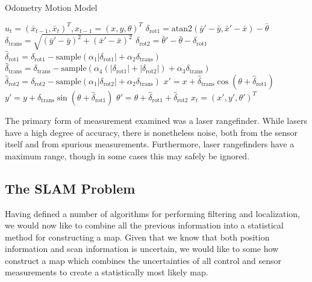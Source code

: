 \documentclass[english]{article}
\begin{document}
\begin{algorithm}
\caption{Odometry Motion Model}
\label{alg:odometry_model}
\begin{algorithmic}
	\REQUIRE $u_t = (\bar{x}_{t-1},\bar{x}_t)^T, x_{t-1} = (x, y, \theta)^T$
        \STATE $\delta_{\mathrm{rot1}} = \mathrm{atan2}(\bar{y}' - \bar{y}, \bar{x}' - \bar{x}) - \bar{\theta}$
        \STATE $\delta_{\mathrm{trans}} = \sqrt{(\bar{y}' - \bar{y})^2 + (\bar{x}' - \bar{x})^2}$
        \STATE $\delta_{\mathrm{rot2}} = \bar{\theta}' - \bar{\theta} - \delta_{\mathrm{rot1}}$
        \STATE $\hat{\delta}_{\mathrm{rot1}} = \delta_{\mathrm{rot1}} - \textrm{sample}(\alpha_1|\delta_{\mathrm{rot1}}| + \alpha_2\delta_{\mathrm{trans}})$
        \STATE $\hat{\delta}_{\mathrm{trans}} = \delta_{\mathrm{trans}} - \textrm{sample}(\alpha_4(|\delta_{\mathrm{rot1}}| + |\delta_{\mathrm{rot2}}|)+ \alpha_3\delta_{\mathrm{trans}})$
        \STATE $\hat{\delta}_{\mathrm{rot2}} = \delta_{\mathrm{rot2}} - \textrm{sample}(\alpha_1|\delta_{\mathrm{rot2}}| + \alpha_2\delta_{\mathrm{trans}})$
        \STATE $x' = x + \hat{\delta}_{\mathrm{trans}}\cos{(\theta + \hat{\delta}_{\mathrm{rot1}})} $
        \STATE $y' = y + \hat{\delta}_{\mathrm{trans}}\sin{(\theta + \hat{\delta}_{\mathrm{rot1}})} $
        \STATE $\theta' = \theta + \hat{\delta}_{\mathrm{rot1}} + \hat{\delta}_{\mathrm{rot2}}$
        \RETURN $x_t = (x', y', \theta')^T$
\end{algorithmic}
\end{algorithm}

The primary form of measurement examined was a laser rangefinder. While lasers have a high degree of accuracy, there is nonetheless noise, both from the sensor itself and from spurious measurements. Furthermore, laser rangefinders have a maximum range, though in some cases this may safely be ignored. 

\subsection{The SLAM Problem}
Having defined a number of algorithms for performing filtering and localization, we would now like to combine all the previous information into a statistical method for constructing a map. Given that we know that both position information and scan information is uncertain, we would like to some how construct a map which combines the uncertainties of all control and sensor measurements to create a statistically most likely map.
\end{document}
